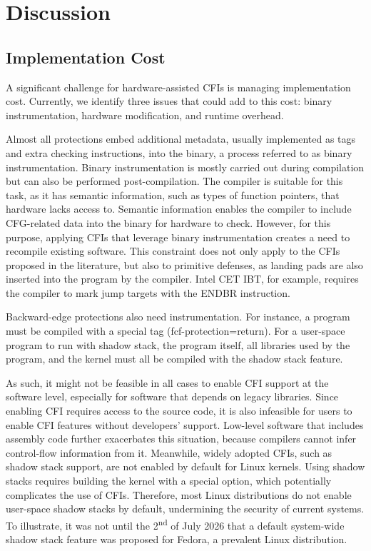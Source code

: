 \documentclass[journal,onecolumn]{IEEEtran}
\begin{document}
\section{Discussion}

\subsection{Implementation Cost} \label{sec:cost}


A significant challenge for hardware-assisted CFIs is managing implementation cost. Currently, we identify three issues that could add to this cost: binary instrumentation, hardware modification, and runtime overhead.

Almost all protections embed additional metadata, usually implemented as tags and extra checking instructions, into the binary, a process referred to as binary instrumentation. Binary instrumentation is mostly carried out during compilation but can also be performed post-compilation. The compiler is suitable for this task, as it has semantic information, such as types of function pointers, that hardware lacks access to. Semantic information enables the compiler to include CFG-related data into the binary for hardware to check. However, for this purpose, applying CFIs that leverage binary instrumentation creates a need to recompile existing software. This constraint does not only apply to the CFIs proposed in the literature, but also to primitive defenses, as landing pads are also inserted into the program by the compiler. Intel CET IBT, for example,  requires the compiler to mark jump targets with the ENDBR instruction\cite{ControlflowEnforcementTechnology}. 

Backward-edge protections also need instrumentation. For instance, a program must be compiled with a special tag (fcf-protection=return)\cite{FCFProtection}. For a user-space program to run with shadow stack, the program itself, all libraries used by the program, and the kernel must all be compiled with the shadow stack feature.

As such, it might not be feasible in all cases to enable CFI support at the software level, especially for software that depends on legacy libraries. Since enabling CFI requires access to the source code, it is also infeasible for users to enable CFI features without developers' support. Low-level software that includes assembly code further exacerbates this situation, because compilers cannot infer control-flow information from it. Meanwhile, widely adopted CFIs, such as shadow stack support, are not enabled by default for Linux kernels. Using shadow stacks requires building the kernel with a special option, which potentially complicates the use of CFIs\cite{ControlflowEnforcementTechnology}. Therefore, most Linux distributions do not enable user-space shadow stacks by default, undermining the security of current systems. To illustrate, it was not until the 2\textsuperscript{nd} of July 2026 that a default system-wide shadow stack feature was proposed for Fedora\cite{F45ChangeProposal2026}, a prevalent Linux distribution\cite{FedoraLinux}.
\end{document}
